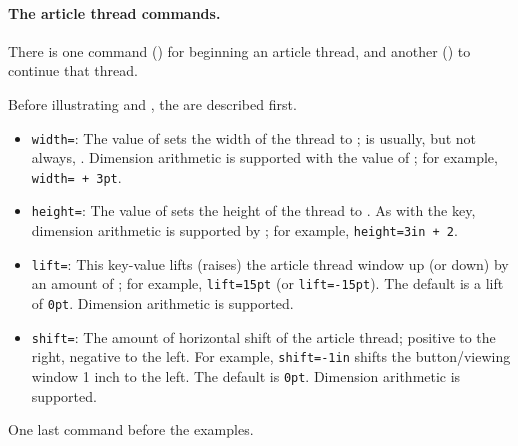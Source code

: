 \documentclass{article}
\begin{document}
\paragraph*{The article thread commands.} There is one command
() for beginning an article thread, and another ()
to continue that thread.
\bVerb{}%
\begin{dCmd}[commandchars=!()]{\bxSize}
\end{dCmd}
\endgroup\noindent Before illustrating  and , the
 are described first.
\begin{itemize}
\item \texttt{width=}: The value of  sets the
    width of the thread to ;  is usually, but
    not always, . Dimension arithmetic is supported with the
    value of ; for example, \texttt{width=\,+\,3pt}.

\item \texttt{height=}: The value of  sets the
    height of the thread to . As with the  key,
    dimension arithmetic is supported by ; for
    example, \texttt{height=3in\,+\,2}.

\item \texttt{lift=}: This key-value lifts (raises) the
    article thread window up (or down) by an amount of ; for
    example, \texttt{lift=15pt} (or \texttt{lift=-15pt}). The default is a
    lift of \texttt{0pt}. Dimension arithmetic is supported.

\item \texttt{shift=}: The amount of horizontal shift of the
    article thread; positive to the right, negative to the left. For
    example, \texttt{shift=-1in} shifts the button/viewing window 1 inch to
    the left. The default is \texttt{0pt}. Dimension arithmetic is supported.
\end{itemize}
One last command before the examples.
\end{document}
